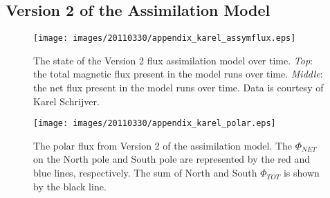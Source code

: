 \documentclass[namedreferences]{solarphysics}
\begin{document}
\begin{article}
  


\appendix
\section{Version 2 of the Assimilation Model}

\begin{figure}[!t]
\begin{center}
\texttt{[image: images/20110330/appendix\_karel\_assymflux.eps]}
\end{center}
\caption{The state of the Version 2 flux assimilation model over time. \emph{Top}: the total magnetic flux present in the model runs over time. \emph{Middle}: the net flux present in the model runs over time. Data is courtesy of Karel Schrijver.}
\label{plot_assim}
\end{figure}

\begin{figure}[!t]
\begin{center}
\texttt{[image: images/20110330/appendix\_karel\_polar.eps]}
\end{center}
\caption{The polar flux from Version 2 of the assimilation model. The $\Phi_{NET}$ on the North pole and South pole are represented by the red and blue lines, respectively. The sum of North and South $\Phi_{TOT}$ is shown by the black line.}
\label{plot_assim_poles}
\end{figure}


\end{article}
\end{document}
